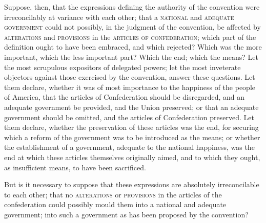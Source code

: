 Suppose, then, that the expressions defining the authority of the convention were irreconcilably at variance with each other; that a \textsc{national} and \textsc{adequate government} could not possibly, in the judgment of the convention, be affected by \textsc{alterations} and \textsc{provisions} in the \textsc{articles of confederation}; which part of the definition ought to have been embraced, and which rejected? 
Which was the more important, which the less important part? 
Which the end; which the means? 
Let the most scrupulous expositors of delegated powers; let the most inveterate objectors against those exercised by the convention, answer these questions. 
Let them declare, whether it was of most importance to the happiness of the people of America, that the articles of Confederation should be disregarded, and an adequate government be provided, and the Union preserved; or that an adequate government should be omitted, and the articles of Confederation preserved. 
Let them declare, whether the preservation of these articles was the end, for securing which a reform of the government was to be introduced as the means; or whether the establishment of a government, adequate to the national happiness, was the end at which these articles themselves originally aimed, and to which they ought, as insufficient means, to have been sacrificed.

But is it necessary to suppose that these expressions are absolutely irreconcilable to each other; that no \textsc{alterations} or \textsc{provisions} in the articles of the confederation could possibly mould them into a national and adequate government; into such a government as has been proposed by the convention?

